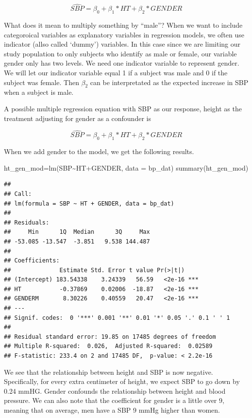 \documentclass[
]{book}
\newenvironment{Shaded}{\begin{snugshade}}{\end{snugshade}}
\newcommand{\AttributeTok}[1]{\textcolor[rgb]{0.77,0.63,0.00}{#1}}
\newcommand{\FunctionTok}[1]{\textcolor[rgb]{0.00,0.00,0.00}{#1}}
\newcommand{\NormalTok}[1]{#1}
\newcommand{\OtherTok}[1]{\textcolor[rgb]{0.56,0.35,0.01}{#1}}
\newcommand{\SpecialCharTok}[1]{\textcolor[rgb]{0.00,0.00,0.00}{#1}}
\begin{document}
\[\widehat{SBP}=\beta_0+\beta_1*HT+\beta_2*GENDER\]

What does it mean to multiply something by ``male''? When we want to include categoroical variables as explanatory variables in regression models, we often use indicator (allso called `dummy') variables. In this case since we are limiting our study population to only subjects who identify as male or female, our variable gender only has two levels. We need one indicator variable to represent gender. We will let our indicator variable equal 1 if a subject was male and 0 if the subject was female. Then \(\beta_2\) can be interpretated as the expected increase in SBP when a subject is male.

A possible multiple regression equation with SBP as our response, height as the treatment adjusting for gender as a confounder is

\[\widehat{SBP}=\beta_0+\beta_1*HT+\beta_2*GENDER\]

When we add gender to the model, we get the following results.

\begin{Shaded}
\begin{Highlighting}[]
\NormalTok{ht\_gen\_mod}\OtherTok{=}\FunctionTok{lm}\NormalTok{(SBP}\SpecialCharTok{\textasciitilde{}}\NormalTok{HT}\SpecialCharTok{+}\NormalTok{GENDER,}
         \AttributeTok{data =}\NormalTok{ bp\_dat)}
\FunctionTok{summary}\NormalTok{(ht\_gen\_mod)}
\end{Highlighting}
\end{Shaded}

\begin{verbatim}
## 
## Call:
## lm(formula = SBP ~ HT + GENDER, data = bp_dat)
## 
## Residuals:
##     Min      1Q  Median      3Q     Max 
## -53.085 -13.547  -3.851   9.538 144.487 
## 
## Coefficients:
##              Estimate Std. Error t value Pr(>|t|)    
## (Intercept) 183.54338    3.24339   56.59   <2e-16 ***
## HT           -0.37869    0.02006  -18.87   <2e-16 ***
## GENDERM       8.30226    0.40559   20.47   <2e-16 ***
## ---
## Signif. codes:  0 '***' 0.001 '**' 0.01 '*' 0.05 '.' 0.1 ' ' 1
## 
## Residual standard error: 19.85 on 17485 degrees of freedom
## Multiple R-squared:  0.026,  Adjusted R-squared:  0.02589 
## F-statistic: 233.4 on 2 and 17485 DF,  p-value: < 2.2e-16
\end{verbatim}

We see that the relationship between height and SBP is now negative. Specifically, for every extra centimeter of height, we expect SBP to go down by 0.24 mmHG. Gender confounds the relationship between height and blood pressure. We can also note that the coefficient for gender is a little over 9, meaning that on average, men have a SBP 9 mmHg higher than women.
\end{document}
